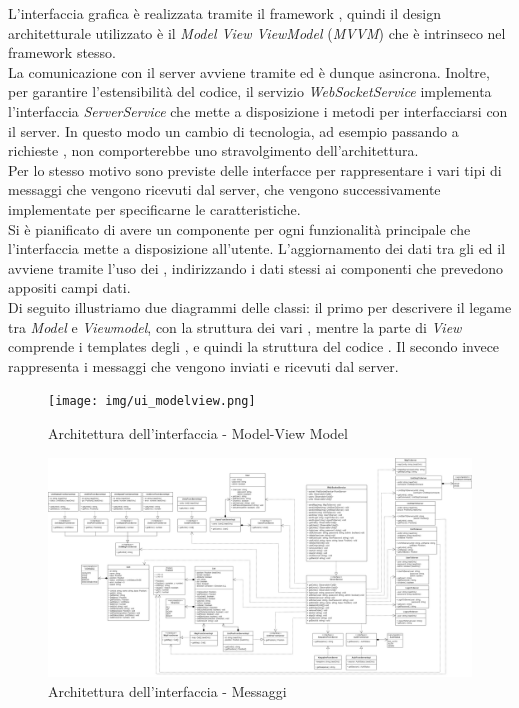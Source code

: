 L'interfaccia grafica è realizzata tramite il framework , quindi il design architetturale utilizzato è il \textit{Model View ViewModel} (\textit{MVVM}) che è intrinseco nel framework stesso. \\
La comunicazione con il server avviene tramite  ed è dunque asincrona. 
Inoltre, per garantire l'estensibilità del codice, il servizio \textit{WebSocketService} implementa l'interfaccia \textit{ServerService} che mette a disposizione i metodi per interfacciarsi con il server. In questo modo un cambio di tecnologia, ad esempio passando a richieste , non comporterebbe uno stravolgimento dell'architettura. \\
Per lo stesso motivo sono previste delle interfacce per rappresentare i vari tipi di messaggi che vengono ricevuti dal server, che vengono successivamente implementate per specificarne le caratteristiche. \\
Si è pianificato di avere un componente per ogni funzionalità principale che l'interfaccia mette a disposizione all'utente. L'aggiornamento dei dati tra gli  ed il  avviene tramite l'uso dei , indirizzando i dati stessi ai componenti che prevedono appositi campi dati. \\
\newline
Di seguito illustriamo due diagrammi delle classi: il primo per descrivere il legame tra \textit{Model} e \textit{Viewmodel}, con la struttura dei vari , mentre la parte di \textit{View} comprende i templates degli , e quindi la struttura del codice .
Il secondo invece rappresenta i messaggi che vengono inviati e ricevuti dal server.

\newpage

\begin{landscape}
	\begin{figure}[h!]
		\texttt{[image: img/ui\_modelview.png]}
		\caption{Architettura dell'interfaccia - Model-View Model}
	\end{figure}
\end{landscape}
\newpage

\begin{landscape}
	\begin{figure}[h!]
		\includegraphics[width=25.5cm]{img/ui_messaggi.png}
		\caption{Architettura dell'interfaccia - Messaggi}
	\end{figure}
\end{landscape}
